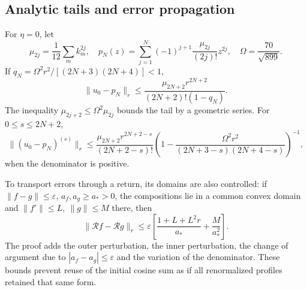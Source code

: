 \subsection{Analytic tails and error propagation}
\label{hmtfg:desarrollo:9}

For \(\eta=0\), let
\[
\mu_{2j}=\frac1{12}\sum_mk_m^{2j},\quad
p_N(z)=\sum_{j=1}^N(-1)^{j+1}\frac{\mu_{2j}}{(2j)!}z^{2j},
\quad\Omega=\frac{70}{\sqrt{899}}.
\]
If \(q_N=\Omega^2r^2/[(2N+3)(2N+4)]<1\),
\[
\|u_0-p_N\|_r\le
\frac{\mu_{2N+2}r^{2N+2}}{(2N+2)!(1-q_N)}.
\]
The inequality \(\mu_{2j+2}\le\Omega^2\mu_{2j}\) bounds the tail by a geometric series. For \(0\le s\le2N+2\),
\[
\|(u_0-p_N)^{(s)}\|_r\le
\frac{\mu_{2N+2}r^{2N+2-s}}{(2N+2-s)!}
\left(1-\frac{\Omega^2r^2}{(2N+3-s)(2N+4-s)}\right)^{-1},
\]
when the denominator is positive.

To transport errors through a return, its domains are also controlled: if \(\|f-g\|\le\varepsilon\), \(a_f,a_g\ge a_*>0\), the compositions lie in a common convex domain and \(\|f'\|\le L,\ \|g\|\le M\) there, then
\[
\|\mathcal Rf-\mathcal Rg\|_r
\le\varepsilon\left[\frac{1+L+L^2r}{a_*}+\frac{M}{a_*^2}\right].
\]
The proof adds the outer perturbation, the inner perturbation, the change of argument due to \(|a_f-a_g|\le\varepsilon\) and the variation of the denominator. These bounds prevent reuse of the initial cosine sum as if all renormalized profiles retained that same form.

